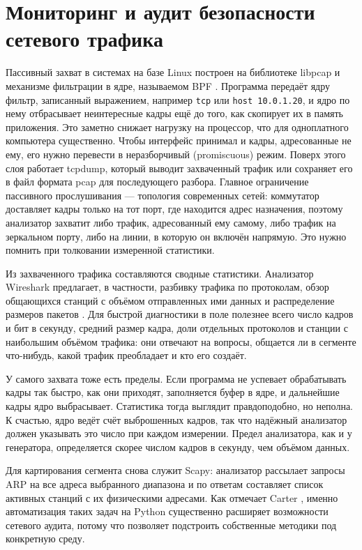 \section{Мониторинг и аудит безопасности сетевого трафика}
\label{sec:monitorovani}

Пассивный захват в системах на базе Linux построен на библиотеке libpcap и механизме фильтрации в ядре, называемом BPF \cite{mccanne1993}. Программа передаёт ядру фильтр, записанный выражением, например \texttt{tcp} или \texttt{host 10.0.1.20}, и ядро по нему отбрасывает неинтересные кадры ещё до того, как скопирует их в память приложения. Это заметно снижает нагрузку на процессор, что для одноплатного компьютера существенно. Чтобы интерфейс принимал и кадры, адресованные не ему, его нужно перевести в неразборчивый (promiscuous) режим. Поверх этого слоя работает tcpdump, который выводит захваченный трафик или сохраняет его в файл формата pcap для последующего разбора. Главное ограничение пассивного прослушивания — топология современных сетей: коммутатор доставляет кадры только на тот порт, где находится адрес назначения, поэтому анализатор захватит либо трафик, адресованный ему самому, либо трафик на зеркальном порту, либо на линии, в которую он включён напрямую. Это нужно помнить при толковании измеренной статистики.

Из захваченного трафика составляются сводные статистики. Анализатор Wireshark предлагает, в частности, разбивку трафика по протоколам, обзор общающихся станций с объёмом отправленных ими данных и распределение размеров пакетов \cite{wiresharkstat}. Для быстрой диагностики в поле полезнее всего число кадров и бит в секунду, средний размер кадра, доли отдельных протоколов и станции с наибольшим объёмом трафика: они отвечают на вопросы, общается ли в сегменте что-нибудь, какой трафик преобладает и кто его создаёт.

У самого захвата тоже есть пределы. Если программа не успевает обрабатывать кадры так быстро, как они приходят, заполняется буфер в ядре, и дальнейшие кадры ядро выбрасывает. Статистика тогда выглядит правдоподобно, но неполна. К счастью, ядро ведёт счёт выброшенных кадров, так что надёжный анализатор должен указывать это число при каждом измерении. Предел анализатора, как и у генератора, определяется скорее числом кадров в секунду, чем объёмом данных.

Для картирования сегмента снова служит Scapy: анализатор рассылает запросы ARP на все адреса выбранного диапазона и по ответам составляет список активных станций с их физическими адресами. Как отмечает Carter \cite{carter2024}, именно автоматизация таких задач на Python существенно расширяет возможности сетевого аудита, потому что позволяет подстроить собственные методики под конкретную среду.

